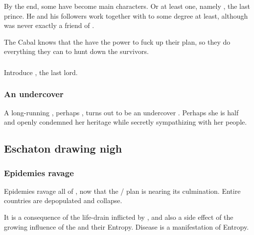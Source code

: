 By the end, some \Kezeradi{} have become main characters. Or at least one, namely , the last \Kezeradi{} prince. He and his followers work together with \Ishnaruchaefir{}\dash to some degree at least, although \Ishnaruchaefir{} was never exactly a friend of \Kezerad. 

The Cabal knows that the \Kezeradi{} have the power to fuck up their plan, so they do everything they can to hunt down the survivors.





\subsubsection[Sithiyacan]{\Sithiyacaan}
Introduce , the last  lord. 





\subsubsection{An undercover \Kezeradi}
A long-running \resphan, perhaps \Achsah, turns out to be an undercover \Kezeradi. Perhaps she is half \Kezeradi{} and openly condemned her heritage while secretly sympathizing with her people.









\subsection{Eschaton drawing nigh}





\subsubsection{Epidemies ravage \Azmith}
Epidemies ravage all of \Azmith, now that the \Iquin/ plan is nearing its culmination. 
Entire countries are depopulated and collapse. 

It is a consequence of the life-drain inflicted by \Iquin, and also a side effect of the growing influence of the \banelords and their Entropy.
Disease is a manifestation of Entropy.

